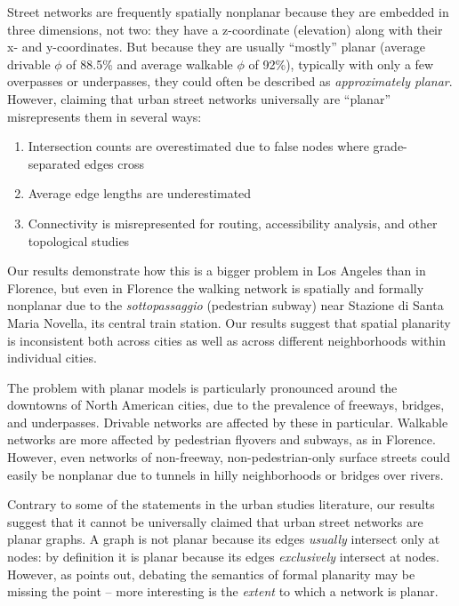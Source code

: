 \documentclass[Afour,sageh,times]{sagej}
\begin{document}
Street networks are frequently spatially nonplanar because they are embedded in three dimensions, not two: they have a z-coordinate (elevation) along with their x- and y-coordinates. But because they are usually \enquote{mostly} planar (average drivable $\phi$ of 88.5\% and average walkable $\phi$ of 92\%), typically with only a few overpasses or underpasses, they could often be described as \emph{approximately planar}. However, claiming that urban street networks universally are \enquote{planar} misrepresents them in several ways:

\begin{enumerate}
	\item{Intersection counts are overestimated due to false nodes where grade-separated edges cross}
	\item{Average edge lengths are underestimated}
	\item{Connectivity is misrepresented for routing, accessibility analysis, and other topological studies}
\end{enumerate}

Our results demonstrate how this is a bigger problem in Los Angeles than in Florence, but even in Florence the walking network is spatially and formally nonplanar due to the \textit{sottopassaggio} (pedestrian subway) near Stazione di Santa Maria Novella, its central train station. Our results suggest that spatial planarity is inconsistent both across cities as well as across different neighborhoods within individual cities.

The problem with planar models is particularly pronounced around the downtowns of North American cities, due to the prevalence of freeways, bridges, and underpasses. Drivable networks are affected by these in particular. Walkable networks are more affected by pedestrian flyovers and subways, as in Florence. However, even networks of non-freeway, non-pedestrian-only surface streets could easily be nonplanar due to tunnels in hilly neighborhoods or bridges over rivers.

Contrary to some of the statements in the urban studies literature, our results suggest that it cannot be universally claimed that urban street networks are planar graphs. A graph is not planar because its edges \emph{usually} intersect only at nodes: by definition it is planar because its edges \emph{exclusively} intersect at nodes. However, as \citet{newman_networks:_2010} points out, debating the semantics of formal planarity may be missing the point -- more interesting is the \emph{extent} to which a network is planar.
\end{document}
